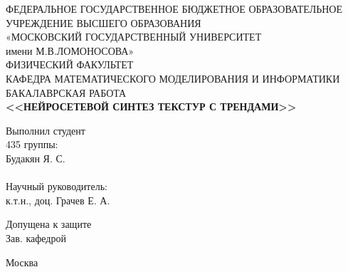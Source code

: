\begin{titlepage} %
	
	\begin{center}
		\small{ФЕДЕРАЛЬНОЕ ГОСУДАРСТВЕННОЕ БЮДЖЕТНОЕ ОБРАЗОВАТЕЛЬНОЕ}\\ 
		УЧРЕЖДЕНИЕ ВЫСШЕГО ОБРАЗОВАНИЯ\\
		«МОСКОВСКИЙ ГОСУДАРСТВЕННЫЙ УНИВЕРСИТЕТ\\
		имени М.В.ЛОМОНОСОВА»\\
		\hfill \break
		ФИЗИЧЕСКИЙ ФАКУЛЬТЕТ \\
		\hfill \break
		КАФЕДРА МАТЕМАТИЧЕСКОГО МОДЕЛИРОВАНИЯ И ИНФОРМАТИКИ\\
		\hfill \break
		\hfill \break
		\hfill \break
		\hfill \break
		БАКАЛАВРСКАЯ РАБОТА\\
		\hfill \break
		\textbf{<<НЕЙРОСЕТЕВОЙ СИНТЕЗ ТЕКСТУР С ТРЕНДАМИ>>}\\
	\end{center}
	
	\hfill \break

	\begin{flushright}
		Выполнил студент \\
		435 группы:\\
		Будакян Я. С.\\
		\underline{\hspace{3cm}}\\
		\hfill \break
		Научный руководитель: \\
		к.т.н., доц. Грачев Е. А.\\
		\underline{\hspace{3cm}}
	\end{flushright}
	
	\begin{flushleft}
		Допущена к защите\\
		Зав. кафедрой \underline{\hspace{3cm}}\\
	\end{flushleft}
	\hfill \break
	\begin{center}
		Москва \\
		\hfill {} 
	\end{center}
	
	\thispagestyle{empty} %
	

\end{titlepage}  %